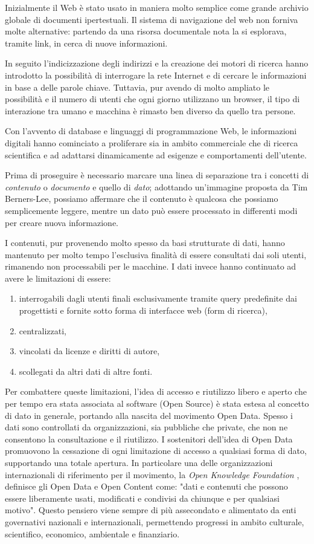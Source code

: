 Inizialmente il Web è stato usato in maniera molto semplice come grande archivio globale di documenti ipertestuali.
Il sistema di navigazione del web non forniva molte alternative: partendo da una risorsa documentale nota la si esplorava, tramite link, in cerca di nuove informazioni. 

In seguito l'indicizzazione degli indirizzi e la creazione dei motori di ricerca hanno introdotto la possibilità di interrogare la rete Internet e di cercare le informazioni in base a delle parole chiave. Tuttavia, pur avendo di molto ampliato le possibilità e il numero di utenti che ogni giorno utilizzano un browser, il tipo di interazione tra umano e macchina è rimasto ben diverso da quello tra persone.

Con l'avvento di database e linguaggi di programmazione Web, le informazioni digitali hanno cominciato a proliferare sia in ambito commerciale che di ricerca scientifica e ad adattarsi dinamicamente ad esigenze e comportamenti  dell'utente. 

Prima di proseguire è necessario marcare una linea di separazione tra i concetti di \textit{contenuto} o \textit{documento} e quello di \textit{dato}; adottando un’immagine proposta da Tim Berners-Lee, possiamo affermare che il contenuto è qualcosa che possiamo semplicemente leggere, mentre un dato può essere processato in differenti modi per creare nuova informazione.

I contenuti, pur provenendo molto spesso da basi strutturate di dati, hanno mantenuto per molto tempo l'esclusiva finalità di essere consultati dai soli utenti, rimanendo non processabili per le macchine. I dati invece hanno continuato ad avere le limitazioni di essere:
\begin{enumerate}
\item interrogabili dagli utenti finali esclusivamente tramite query predefinite dai progettisti e fornite sotto forma di interfacce web (form di ricerca),
\item centralizzati,
\item vincolati da licenze e diritti di autore,
\item scollegati da altri dati di altre fonti.
\end{enumerate}
Per combattere queste limitazioni, l'idea di accesso e riutilizzo libero e aperto che per tempo era stata associata al software (Open Source) è stata estesa al concetto di dato in generale, portando alla nascita del movimento Open Data.
Spesso i dati sono controllati da organizzazioni, sia pubbliche che private, che non ne consentono la consultazione e il riutilizzo. I sostenitori dell'idea di Open Data promuovono la cessazione di ogni limitazione di accesso a qualsiasi forma di dato, supportando una totale apertura. In particolare una delle organizzazioni internazionali di riferimento per il movimento, la \textit{Open Knowledge Foundation} \cite{okfn}, definisce gli Open Data e Open Content come: "dati e contenuti che possono essere liberamente usati, modificati e condivisi da chiunque e per qualsiasi motivo". Questo pensiero viene sempre di più assecondato e alimentato da enti governativi nazionali e internazionali, permettendo progressi in ambito culturale, scientifico, economico, ambientale e finanziario. 

